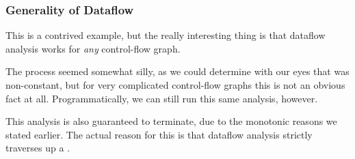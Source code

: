 \documentclass[aspectratio=169, handout]{beamer}
\begin{document}
\begin{frame}[fragile]
  \frametitle{Generality of Dataflow}

  This is a contrived example, but the really interesting thing is that
  dataflow analysis works for \textit{any} control-flow graph.

  \pause
  \vspace{\fill}

  The process seemed somewhat silly, as we could determine with our eyes that
   was non-constant, but for very complicated control-flow graphs this
  is not an obvious fact at all. Programmatically, we can still run this same
  analysis, however.

  \pause
  \vspace{\fill}

  This analysis is also guaranteed to terminate, due to the monotonic reasons
  we stated earlier. The actual reason for this is that dataflow analysis
  strictly traverses up a .
\end{frame}
\end{document}
